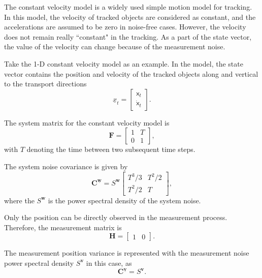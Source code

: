 The constant velocity model is a widely used simple motion model for tracking. In this model, the velocity of tracked objects are considered as constant, and the accelerations are assumed to be zero in noise-free cases. However, the velocity does not remain really ``constant" in the tracking. As a part of the state vector, the value of the velocity can change because of the measurement noise.

Take the 1-D constant velocity model as an example. In the model, the state vector contains the position and velocity of the tracked objects along and vertical to the transport directions \cite{pfaff2019multitarget}
\begin{equation}
    \underline{x}_{t}=
    \begin{bmatrix}
        \mathsf{x}_{t}\\ 
        \dot{\mathsf{x}}_{t}
    \end{bmatrix}.
\end{equation}

The system matrix for the constant velocity model is
\begin{equation}
    \mathbf{F}=\begin{bmatrix}
     1 & T \\ 
     0 & 1
    \end{bmatrix} ,
\end{equation}
with $T$ denoting the time between two subsequent time steps. 

The system noise covariance is given by
\begin{equation}
    \mathbf{C}^{\underline{\boldsymbol{w}}}=S^{\boldsymbol{w}}
    \begin{bmatrix}
     T^3/3 & T^2/2\\ 
     T^2/2 & T 
    \end{bmatrix} ,
\end{equation}
where the $S^{\boldsymbol{w}}$ is the power spectral density of the system noise.

Only the position can be directly observed in the measurement process. Therefore, the measurement matrix is
\begin{equation}
    \mathbf{H}=\begin{bmatrix}
     1 & 0
    \end{bmatrix} .
\end{equation}

The measurement position variance is represented with the measurement noise power spectral density $S^{\boldsymbol{v}}$ in this case, as
\begin{equation}
    \mathbf{C}^{\underline{\boldsymbol{v}}}=S^{\boldsymbol{v}}.
\end{equation}

